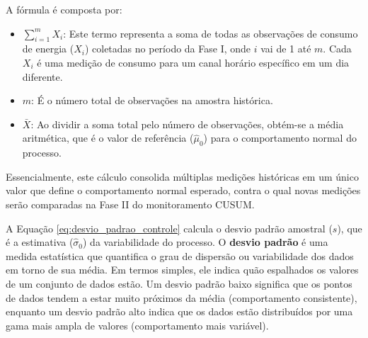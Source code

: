 \begin{itemize}
    A fórmula é composta por:
    \begin{itemize}
        \item \textbf{$\sum_{i=1}^{m} X_i$}: Este termo representa a soma de todas as observações de consumo de energia ($X_i$) coletadas no período da Fase I, onde $i$ vai de 1 até $m$. Cada $X_i$ é uma medição de consumo para um canal horário específico em um dia diferente.
        \item \textbf{$m$}: É o número total de observações na amostra histórica.
        \item \textbf{$\bar{X}$}: Ao dividir a soma total pelo número de observações, obtém-se a média aritmética, que é o valor de referência ($\hat{\mu}_0$) para o comportamento normal do processo.
    \end{itemize}
    Essencialmente, este cálculo consolida múltiplas medições históricas em um único valor que define o comportamento normal esperado, contra o qual novas medições serão comparadas na Fase II do monitoramento CUSUM.

    A Equação \ref{eq:desvio_padrao_controle} calcula o desvio padrão amostral ($s$), que é a estimativa ($\hat{\sigma}_0$) da variabilidade do processo. O \textbf{desvio padrão} é uma medida estatística que quantifica o grau de dispersão ou variabilidade dos dados em torno de sua média. Em termos simples, ele indica quão espalhados os valores de um conjunto de dados estão. Um desvio padrão baixo significa que os pontos de dados tendem a estar muito próximos da média (comportamento consistente), enquanto um desvio padrão alto indica que os dados estão distribuídos por uma gama mais ampla de valores (comportamento mais variável).


\end{itemize}
